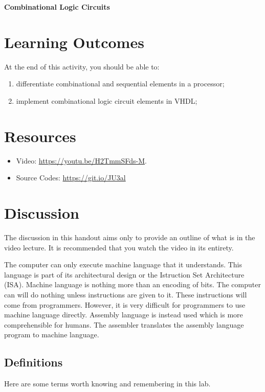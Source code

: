 \documentclass[a4paper, 11pt,oneside]{article}
\begin{document}
\begin{center}
	{\LARGE \textbf{Combinational Logic Circuits}}
\end{center}

\section*{Learning Outcomes}
   At the end of this activity, you should be able to:
   \begin{enumerate}[itemsep=0pt,parsep=0pt]
   	   \item differentiate combinational and sequential elements in a processor;
       \item implement combinational logic circuit elements in VHDL;

   \end{enumerate}   

\tableofcontents

\section{Resources}
\begin{itemize}
	\item Video: \href{https://youtu.be/H2TmmSFds-M}{https://youtu.be/H2TmmSFds-M}.
	\item Source Codes: \href{https://git.io/JU3al}{https://git.io/JU3al}
\end{itemize}	


\section{Discussion}
The discussion in this handout aims only to provide an outline of what is in the video lecture. It is recommended that you watch the video in its entirety.

The computer can only execute machine language that it understands. This language is part of its architectural design or the Istruction Set Architecture (ISA). Machine language is nothing more than an encoding of bits. The computer can will do nothing unless instructions are given to it. These instructions will come from programmers. However, it is very difficult for programmers to use machine language directly. Assembly language is instead used which is more comprehensible for humans. The assembler translates the assembly language program to machine language. 

\subsection{Definitions}
Here are some terms worth knowing and remembering in this lab.
\end{document}
